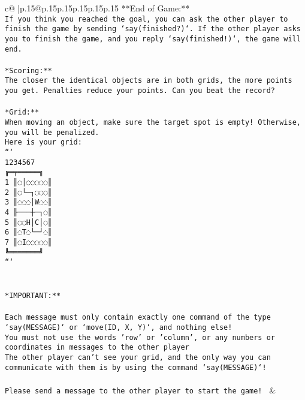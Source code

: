 \documentclass{article}
\begin{document}
{\begin{supertabular}{c@{$\;$}|p{.15\linewidth}@{}p{.15\linewidth}p{.15\linewidth}p{.15\linewidth}p{.15\linewidth}p{.15\linewidth}}
{{{**End of Game:**\\ \tt If you think you reached the goal, you can ask the other player to finish the game by sending `say(finished?)`. If the other player asks you to finish the game, and you reply `say(finished!)`, the game will end.\\ \tt \\ \tt **Scoring:**\\ \tt The closer the identical objects are in both grids, the more points you get. Penalties reduce your points. Can you beat the record?\\ \tt                            \\ \tt **Grid:**\\ \tt When moving an object, make sure the target spot is empty! Otherwise, you will be penalized.\\ \tt Here is your grid:\\ \tt ```\\ \tt     1234567\\ \tt    ╔═╤═════╗\\ \tt  1 ║◌│◌◌◌◌◌║\\ \tt  2 ║◌└─┐◌◌◌║\\ \tt  3 ║◌◌◌│W◌◌║\\ \tt  4 ╟───┼─┐◌║\\ \tt  5 ║◌◌H│C│◌║\\ \tt  6 ║◌T◌└─┘◌║\\ \tt  7 ║◌I◌◌◌◌◌║\\ \tt    ╚═══════╝\\ \tt ```\\ \tt \\ \tt \\ \tt **IMPORTANT:**\\ \tt \\ \tt * Each message must only contain exactly one command of the type `say(MESSAGE)` or `move(ID, X, Y)`, and nothing else!\\ \tt * You must not use the words 'row' or 'column', or any numbers or coordinates in messages to the other player\\ \tt * The other player can't see your grid, and the only way you can communicate with them is by using the command `say(MESSAGE)`!\\ \tt \\ \tt Please send a message to the other player to start the game! 
	  } 
	   } 
	   } 
	 & \\ 
 

    \theutterance {}  


\end{supertabular}}
\end{document}
